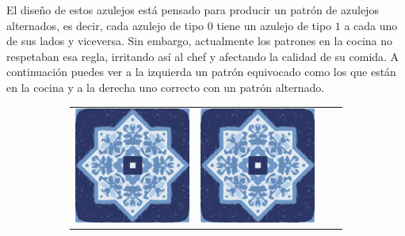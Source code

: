 \documentclass{oci}
\begin{document}
\begin{problemDescription}
El diseño de estos azulejos está pensado para producir un patrón de azulejos
alternados, es decir, cada azulejo de tipo $0$ tiene un azulejo de tipo $1$
a cada uno de sus lados y viceversa.
Sin embargo, actualmente los patrones en la cocina no respetaban esa regla,
irritando así al chef y afectando la calidad de su comida.
A continuación puedes ver a la izquierda un patrón equivocado como los que están
en la cocina y a la derecha uno correcto con un patrón alternado.

\begin{figure}[h]
\setlength{\tabcolsep}{0.5pt}
\begin{subfigure}{0.45\textwidth}
  \begin{center}
    {
      \renewcommand{\arraystretch}{0.25}
      \begin{tabular}{cccc}
        \includegraphics[scale=0.3]{a.eps} &
        \includegraphics[scale=0.3]{a.eps} &

\end{tabular}}
\end{center}
\end{subfigure}
\end{figure}
\end{problemDescription}
\end{document}
